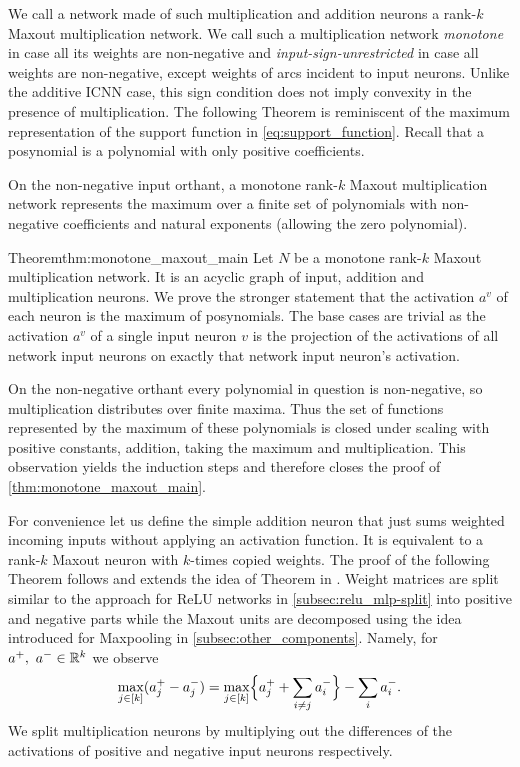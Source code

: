 We call a network made of such multiplication and addition neurons a rank-$k$ Maxout multiplication network.
We call such a multiplication network \emph{monotone} in case all its weights are non-negative and \emph{input-sign-unrestricted} in case all weights are non-negative, except weights of arcs incident to input neurons. Unlike the additive ICNN case, this sign condition does not imply convexity in the presence of multiplication.
The following Theorem is reminiscent of the maximum representation of the support function in \cref{eq:support_function}.
Recall that a posynomial is a polynomial with only positive coefficients.

\begin{theorem} \label{thm:monotone_maxout_main}
    On the non-negative input orthant, a monotone rank-$k$ Maxout multiplication network represents the maximum over a finite set of polynomials with non-negative coefficients and natural exponents (allowing the zero polynomial).
\end{theorem}

\begin{proofref}{Theorem}{thm:monotone_maxout_main}
    Let $N$ be a monotone rank-$k$ Maxout multiplication network. It is an acyclic graph of input, addition and multiplication neurons.
    We prove the stronger statement that the activation $a^v$ of each neuron is the maximum of posynomials.
    The base cases are trivial as the activation $a^v$ of a single input neuron $v$ is the projection of the activations of all network input neurons on exactly that network input neuron's activation.

    On the non-negative orthant every polynomial in question is non-negative, so multiplication distributes over finite maxima. Thus the set of functions represented by the maximum of these polynomials is closed under scaling with positive constants, addition, taking the maximum and multiplication.
    This observation yields the induction steps and therefore closes the proof of \cref{thm:monotone_maxout_main}.
\end{proofref}

For convenience let us define the simple addition neuron that just sums weighted incoming inputs without applying an activation function. It is equivalent to a rank-$k$ Maxout neuron with $k$-times copied weights.
The proof of the following Theorem follows and extends the idea of Theorem in .
Weight matrices are split similar to the approach for ReLU networks in \cref{subsec:relu_mlp-split} into positive and negative parts while the Maxout units are decomposed using the idea introduced for Maxpooling in \cref{subsec:other_components}.
Namely, for $a^+, \ a^- \in \mathbb{R}^k$ we observe
\begin{align}
    \max_{j\in[k]}(a_j^+ - a_j^-) = \max_{j\in[k]}\Bigl\{a_j^+ + \sum_{i\neq j} a_i^- \Bigr\} - \sum_{i} a_i^-.
\end{align}
We split multiplication neurons by multiplying out the differences of the activations of positive and negative input neurons respectively.

